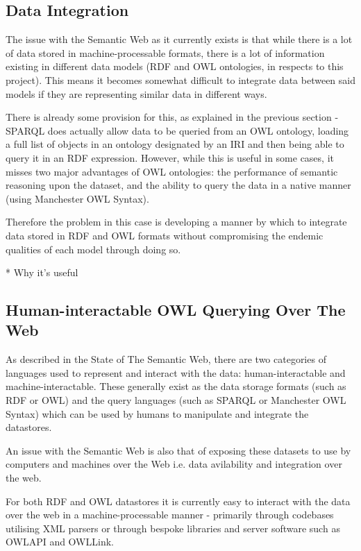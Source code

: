 \documentclass{article}
\begin{document}
\subsection{Data Integration}

The issue with the Semantic Web as it currently exists is that while there is a
lot of data stored in machine-processable formats, there is a lot of information 
existing in different data models (RDF and OWL ontologies, in respects to this project). 
This means it becomes somewhat difficult to integrate data between said models 
if they are representing similar data in different ways.

There is already some provision for this, as explained in the previous section - 
SPARQL does actually allow data to be queried from an OWL ontology, loading a full 
list of objects in an ontology designated by an IRI and then being able to query 
it in an RDF expression. However, while this is useful in some cases, it misses 
two major advantages of OWL ontologies: the performance of semantic reasoning
upon the dataset, and the ability to query the data in a native manner (using 
Manchester OWL Syntax).

Therefore the problem in this case is developing a manner by which to integrate
data stored in RDF and OWL formats without compromising the endemic qualities of 
each model through doing so.

* Why it's useful

\subsection{Human-interactable OWL Querying Over The Web}

As described in the State of The Semantic Web, there are two categories of
languages used to represent and interact with the data: human-interactable and
machine-interactable. These generally exist as the data storage formats (such as
RDF or OWL) and the query languages (such as SPARQL or Manchester OWL Syntax)
which can be used by humans to manipulate and integrate the datastores.

An issue with the Semantic Web is also that of exposing these datasets to use by
computers and machines over the Web i.e. data avilability and integration over
the web.

For both RDF and OWL datastores it is currently easy to interact with the data
over the web in a machine-processable manner - primarily through codebases
utilising XML parsers or through bespoke libraries and server software such as 
OWLAPI and OWLLink.
\end{document}
